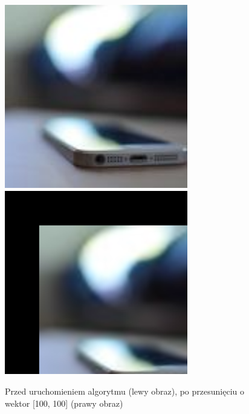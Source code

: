 \documentclass[a4paper,12pt]{book}
\begin{document}
\begin{figure}[H]
	\caption{Przed uruchomieniem algorytmu (lewy obraz), po przesunięciu o wektor [100, 100] (prawy obraz)}
	\includegraphics[width=8cm, height=8cm]{phone-unmodified.jpg}
	\includegraphics[width=8cm, height=8cm]{phone-translate.png}
\end{figure}
\end{document}
